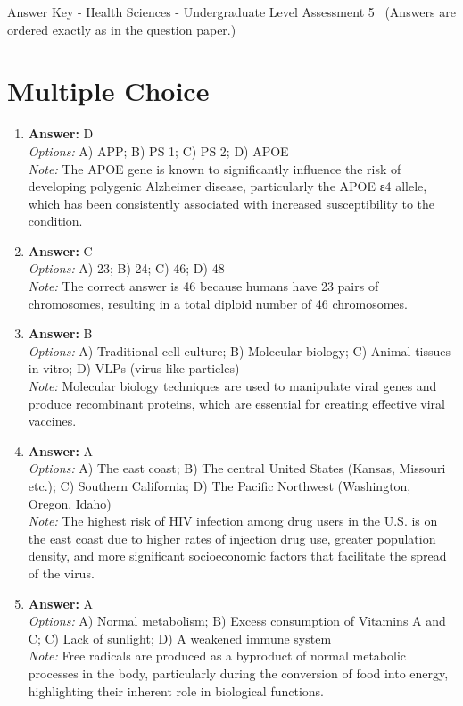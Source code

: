 \documentclass[12pt]{article}
\begin{document}
\begin{center}
Answer Key - Health Sciences - Undergraduate Level Assessment 5 \
\small (Answers are ordered exactly as in the question paper.)
\end{center}

\section*{Multiple Choice}
\begin{enumerate}[label=\arabic*.]
\item \textbf{Answer:} D
\\ \textit{Options:} A) APP; B) PS 1; C) PS 2; D) APOE
\\ \textit{Note:} The APOE gene is known to significantly influence the risk of developing polygenic Alzheimer disease, particularly the APOE ε4 allele, which has been consistently associated with increased susceptibility to the condition.
\item \textbf{Answer:} C
\\ \textit{Options:} A) 23; B) 24; C) 46; D) 48
\\ \textit{Note:} The correct answer is 46 because humans have 23 pairs of chromosomes, resulting in a total diploid number of 46 chromosomes.
\item \textbf{Answer:} B
\\ \textit{Options:} A) Traditional cell culture; B) Molecular biology; C) Animal tissues in vitro; D) VLPs (virus like particles)
\\ \textit{Note:} Molecular biology techniques are used to manipulate viral genes and produce recombinant proteins, which are essential for creating effective viral vaccines.
\item \textbf{Answer:} A
\\ \textit{Options:} A) The east coast; B) The central United States (Kansas, Missouri etc.); C) Southern California; D) The Pacific Northwest (Washington, Oregon, Idaho)
\\ \textit{Note:} The highest risk of HIV infection among drug users in the U.S. is on the east coast due to higher rates of injection drug use, greater population density, and more significant socioeconomic factors that facilitate the spread of the virus.
\item \textbf{Answer:} A
\\ \textit{Options:} A) Normal metabolism; B) Excess consumption of Vitamins A and C; C) Lack of sunlight; D) A weakened immune system
\\ \textit{Note:} Free radicals are produced as a byproduct of normal metabolic processes in the body, particularly during the conversion of food into energy, highlighting their inherent role in biological functions.
\end{enumerate}
\end{document}
